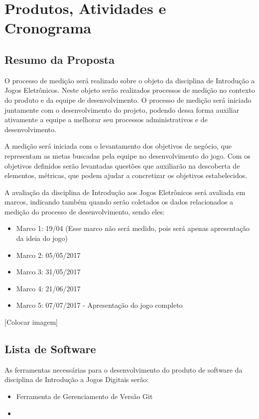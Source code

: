 \chapter{Produtos, Atividades e Cronograma}

\section{Resumo da Proposta}
	O processo de medição será realizado sobre o objeto da disciplina de Introdução a Jogos Eletrônicos. Neste objeto serão realizados processos de medição no contexto do produto e da equipe de desenvolvimento. O processo de medição será iniciado juntamente com o desenvolvimento do projeto, podendo dessa forma auxiliar ativamente a equipe a melhorar seu processos administrativos e de desenvolvimento.
	
	A medição será iniciada com o levantamento dos objetivos de negócio, que representam as metas buscadas pela equipe no desenvolvimento do jogo. Com os objetivos definidos serão levantadas questões que auxiliarão na descoberta de elementos, métricas, que podem ajudar a concretizar os objetivos estabelecidos.

	A avaliação da disciplina de Introdução aos Jogos Eletrônicos será avaliada em marcos, indicando também quando serão coletados os dados relacionados a medição do processo de desenvolvimento, sendo eles:

	\begin{itemize}
		\item Marco 1: 19/04 (Esse marco não será medido, pois será apenas apresentação da ideia do jogo)
		\item Marco 2: 05/05/2017
		\item Marco 3: 31/05/2017
		\item Marco 4: 21/06/2017
		\item Marco 5: 07/07/2017 - Apresentação do jogo completo
	\end{itemize}
	
	[Colocar imagem]
	
\section{Lista de Software}
	As ferramentas necessárias para o desenvolvimento do produto de software da disciplina de Introdução a Jogos Digitais serão: 
	\begin{itemize}
		\item Ferramenta de Gerenciamento de Versão Git
		\item
	\end{itemize}
	
